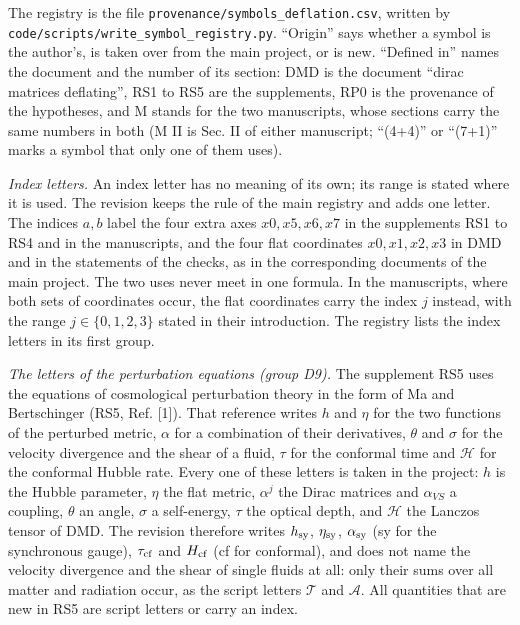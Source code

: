 \documentclass[
  10pt,
]{article}
\begin{document}
The registry is the file \texttt{provenance/symbols\_deflation.csv},
written by \texttt{code/scripts/write\_symbol\_registry.py}. ``Origin''
says whether a symbol is the author's, is taken over from the main
project, or is new. ``Defined in'' names the document and the number of
its section: DMD is the document ``dirac matrices deflating'', RS1 to
RS5 are the supplements, RP0 is the provenance of the hypotheses, and M
stands for the two manuscripts, whose sections carry the same numbers in
both (M II is Sec. II of either manuscript; ``(4+4)'' or ``(7+1)'' marks
a symbol that only one of them uses).

\emph{Index letters.} An index letter has no meaning of its own; its
range is stated where it is used. The revision keeps the rule of the
main registry and adds one letter. The indices \(a,b\) label the four
extra axes \(x0,x5,x6,x7\) in the supplements RS1 to RS4 and in the
manuscripts, and the four flat coordinates \(x0,x1,x2,x3\) in DMD and in
the statements of the checks, as in the corresponding documents of the
main project. The two uses never meet in one formula. In the
manuscripts, where both sets of coordinates occur, the flat coordinates
carry the index \(j\) instead, with the range \(j\in\{0,1,2,3\}\) stated
in their introduction. The registry lists the index letters in its first
group.

\emph{The letters of the perturbation equations (group D9).} The
supplement RS5 uses the equations of cosmological perturbation theory in
the form of Ma and Bertschinger (RS5, Ref. {[}1{]}). That reference
writes \(h\) and \(\eta\) for the two functions of the perturbed metric,
\(\alpha\) for a combination of their derivatives, \(\theta\) and
\(\sigma\) for the velocity divergence and the shear of a fluid,
\(\tau\) for the conformal time and \(\mathcal H\) for the conformal
Hubble rate. Every one of these letters is taken in the project: \(h\)
is the Hubble parameter, \(\eta\) the flat metric, \(\alpha^j\) the
Dirac matrices and \(\alpha_{VS}\) a coupling, \(\theta\) an angle,
\(\sigma\) a self-energy, \(\tau\) the optical depth, and \(\mathcal H\)
the Lanczos tensor of DMD. The revision therefore writes \(h_{\rm sy}\),
\(\eta_{\rm sy}\), \(\alpha_{\rm sy}\) (sy for the synchronous gauge),
\(\tau_{\rm cf}\) and \(H_{\rm cf}\) (cf for conformal), and does not
name the velocity divergence and the shear of single fluids at all: only
their sums over all matter and radiation occur, as the script letters
\(\mathcal T\) and \(\mathcal A\). All quantities that are new in RS5
are script letters or carry an index.
\end{document}
